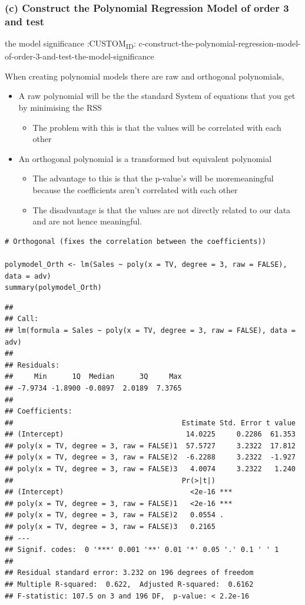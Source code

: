 \documentclass[11pt]{article}
\begin{document}
\subsubsection{(c) Construct the Polynomial Regression Model of order 3 and test}
\label{sec:orgda1638b}
the model significance
:CUSTOM\textsubscript{ID}: c-construct-the-polynomial-regression-model-of-order-3-and-test-the-model-significance

When creating polynomial models there are raw and orthogonal
polynomials,

\begin{itemize}
\item A raw polynomial will be the the standard System of equations that you
get by minimising the RSS

\begin{itemize}
\item The problem with this is that the values will be correlated with
each other
\end{itemize}

\item An orthogonal polynomial is a transformed but equivalent polynomial

\begin{itemize}
\item The advantage to this is that the p-value's will be moremeaningful
because the coefficients aren't correlated with each other
\item The disadvantage is that the values are not directly related to our
data and are not hence meaningful.
\end{itemize}
\end{itemize}

\begin{verbatim}
# Orthogonal (fixes the correlation between the coefficients))

polymodel_Orth <- lm(Sales ~ poly(x = TV, degree = 3, raw = FALSE), data = adv)
summary(polymodel_Orth)
\end{verbatim}

\begin{verbatim}
## 
## Call:
## lm(formula = Sales ~ poly(x = TV, degree = 3, raw = FALSE), data = adv)
## 
## Residuals:
##     Min      1Q  Median      3Q     Max 
## -7.9734 -1.8900 -0.0897  2.0189  7.3765 
## 
## Coefficients:
##                                        Estimate Std. Error t value
## (Intercept)                             14.0225     0.2286  61.353
## poly(x = TV, degree = 3, raw = FALSE)1  57.5727     3.2322  17.812
## poly(x = TV, degree = 3, raw = FALSE)2  -6.2288     3.2322  -1.927
## poly(x = TV, degree = 3, raw = FALSE)3   4.0074     3.2322   1.240
##                                        Pr(>|t|)    
## (Intercept)                              <2e-16 ***
## poly(x = TV, degree = 3, raw = FALSE)1   <2e-16 ***
## poly(x = TV, degree = 3, raw = FALSE)2   0.0554 .  
## poly(x = TV, degree = 3, raw = FALSE)3   0.2165    
## ---
## Signif. codes:  0 '***' 0.001 '**' 0.01 '*' 0.05 '.' 0.1 ' ' 1
## 
## Residual standard error: 3.232 on 196 degrees of freedom
## Multiple R-squared:  0.622,  Adjusted R-squared:  0.6162 
## F-statistic: 107.5 on 3 and 196 DF,  p-value: < 2.2e-16
\end{verbatim}
\end{document}
